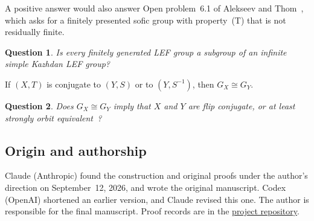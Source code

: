 \documentclass[11pt]{amsart}
\newtheorem{question}{Question}
\begin{document}
A positive answer would also answer Open problem~6.1 of Alekseev and
Thom~\cite{AlekseevThom}, which asks for a finitely presented sofic group
with property~\textup{(T)} that is not residually finite.

\begin{question}
Is every finitely generated LEF group a subgroup of an infinite simple
Kazhdan LEF group?
\end{question}

If $(X,T)$ is conjugate to $(Y,S)$ or to $(Y,S^{-1})$, then $G_X\cong G_Y$.

\begin{question}
Does $G_X\cong G_Y$ imply that $X$ and $Y$ are flip conjugate, or at least
strongly orbit equivalent~\cite{GPS}?
\end{question}

\subsection*{Origin and authorship}
Claude (Anthropic) found the construction and original proofs under
the author's direction on September~12, 2026, and wrote the original
manuscript. Codex (OpenAI) shortened an earlier version, and Claude
revised this one.
The author is responsible for the final manuscript. Proof records are
in the \href{https://github.com/SauersML/group-approximation}{project repository}.
\end{document}
